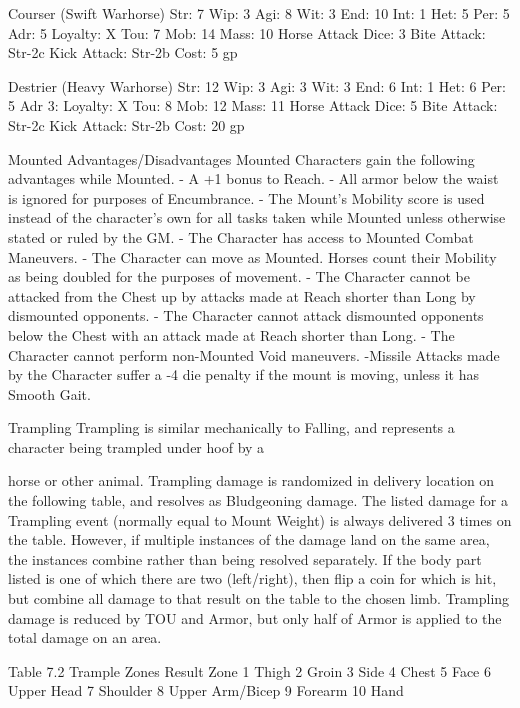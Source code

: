 \documentclass[oneside,11pt,english]{book}
\begin{document}
 

Courser (Swift Warhorse) 
Str: 7 Wip: 3 
Agi: 8 Wit: 3 
End: 10 Int: 1 
Het: 5 Per: 5 
Adr: 5 Loyalty: X 
Tou: 7 Mob: 14 
Mass: 10 
Horse Attack Dice: 3 
Bite Attack: Str-2c 
Kick Attack: Str-2b 
Cost: 5 gp 

 

Destrier (Heavy Warhorse) 
Str: 12 Wip: 3 
Agi: 3 Wit: 3 
End: 6 Int: 1 
Het: 6 Per: 5 
Adr 3: Loyalty: X 
Tou: 8 Mob: 12 
Mass: 11 
Horse Attack Dice: 5 
Bite Attack: Str-2c 
Kick Attack: Str-2b 
Cost: 20 gp 

 

Mounted Advantages/Disadvantages 
Mounted Characters gain the following advantages while Mounted. 
- A +1 bonus to Reach. 
- All armor below the waist is ignored for purposes of Encumbrance. 
- The Mount's Mobility score is used instead of the character's own for all tasks taken while Mounted 
unless otherwise stated or ruled by the GM. 
- The Character has access to Mounted Combat Maneuvers. 
- The Character can move as Mounted. Horses count their Mobility as being doubled for the purposes of 
movement. 
- The Character cannot be attacked from the Chest up by attacks made at Reach shorter than Long by 
dismounted opponents. 
- The Character cannot attack dismounted opponents below the Chest with an attack made at Reach 
shorter than Long. 
- The Character cannot perform non-Mounted Void maneuvers. 
-Missile Attacks made by the Character suffer a -4 die penalty if the mount is moving, unless it has 
Smooth Gait. 

 

Trampling 
Trampling is similar mechanically to Falling, and represents a character being trampled under hoof by a 


horse or other animal. 
Trampling damage is randomized in delivery location on the following table, and resolves as Bludgeoning 
damage. The listed damage for a Trampling event (normally equal to Mount Weight) is always delivered 
3 times on the table. However, if multiple instances of the damage land on the same area, the instances 
combine rather than being resolved separately. 
If the body part listed is one of which there are two (left/right), then flip a coin for which is hit, but 
combine all damage to that result on the table to the chosen limb. 
Trampling damage is reduced by TOU and Armor, but only half of Armor is applied to the total damage 
on an area. 

 

Table 7.2 Trample Zones 
Result Zone 
1 Thigh 
2 Groin 
3 Side 
4 Chest 
5 Face 
6 Upper Head 
7 Shoulder 
8 Upper Arm/Bicep 
9 Forearm 
10 Hand 
\end{document}

